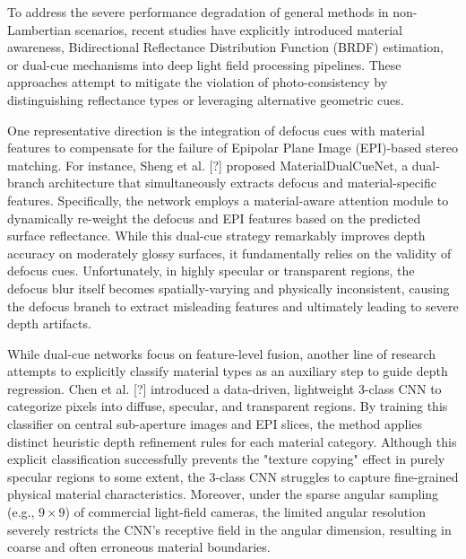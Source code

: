 \documentclass[journal]{IEEEtran}
\begin{document}
To address the severe performance degradation of general methods in non-Lambertian scenarios, recent studies have explicitly introduced material awareness, Bidirectional Reflectance Distribution Function (BRDF) estimation, or dual-cue mechanisms into deep light field processing pipelines. These approaches attempt to mitigate the violation of photo-consistency by distinguishing reflectance types or leveraging alternative geometric cues.

One representative direction is the integration of defocus cues with material features to compensate for the failure of Epipolar Plane Image (EPI)-based stereo matching. For instance, Sheng et al. [?] proposed MaterialDualCueNet, a dual-branch architecture that simultaneously extracts defocus and material-specific features. Specifically, the network employs a material-aware attention module to dynamically re-weight the defocus and EPI features based on the predicted surface reflectance. While this dual-cue strategy remarkably improves depth accuracy on moderately glossy surfaces, it fundamentally relies on the validity of defocus cues. Unfortunately, in highly specular or transparent regions, the defocus blur itself becomes spatially-varying and physically inconsistent, causing the defocus branch to extract misleading features and ultimately leading to severe depth artifacts.

While dual-cue networks focus on feature-level fusion, another line of research attempts to explicitly classify material types as an auxiliary step to guide depth regression. Chen et al. [?] introduced a data-driven, lightweight 3-class CNN to categorize pixels into diffuse, specular, and transparent regions. By training this classifier on central sub-aperture images and EPI slices, the method applies distinct heuristic depth refinement rules for each material category. Although this explicit classification successfully prevents the "texture copying" effect in purely specular regions to some extent, the 3-class CNN struggles to capture fine-grained physical material characteristics. Moreover, under the sparse angular sampling (e.g., $9 \times 9$) of commercial light-field cameras, the limited angular resolution severely restricts the CNN's receptive field in the angular dimension, resulting in coarse and often erroneous material boundaries.
\end{document}
